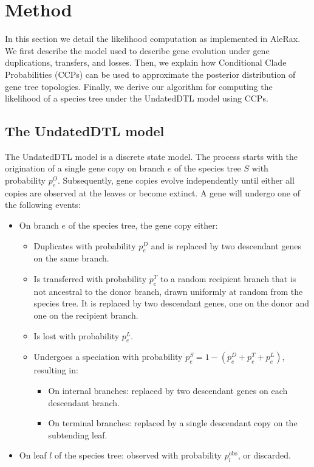 \section{Method}

In this section we detail the likelihood computation as implemented in AleRax.  
We first describe the model used to describe gene evolution under gene duplications, transfers, and losses.  
Then, we explain how Conditional Clade Probabilities (CCPs) can be used to approximate the posterior distribution of gene tree topologies.  
Finally, we derive our algorithm for computing the likelihood of a species tree under the UndatedDTL model using CCPs.

\subsection{The UndatedDTL model}

The UndatedDTL model is a discrete state model. The process starts with the origination of a single gene copy on branch $e$ of the species tree $S$ with probability $p^O_e$.  
Subsequently, gene copies evolve independently until either all copies are observed at the leaves or become extinct.  
A gene will undergo one of the following events:

\begin{itemize}
  \item On branch $e$ of the species tree, the gene copy either:
  \begin{itemize}
    \item Duplicates with probability $p^D_e$ and is replaced by two descendant genes on the same branch.
    \item Is transferred with probability $p^T_e$ to a random recipient branch that is not ancestral to the donor branch, drawn uniformly at random from the species tree. It is replaced by two descendant genes, one on the donor and one on the recipient branch.
    \item Is lost with probability $p^L_e$.
    \item Undergoes a speciation with probability $p^S_e = 1 - (p^D_e + p^T_e + p^L_e)$, resulting in:
    \begin{itemize}
      \item On internal branches: replaced by two descendant genes on each descendant branch.
      \item On terminal branches: replaced by a single descendant copy on the subtending leaf.
    \end{itemize}
  \end{itemize}
  \item On leaf $l$ of the species tree: observed with probability $p^{\text{obs}}_l$, or discarded.
\end{itemize}

